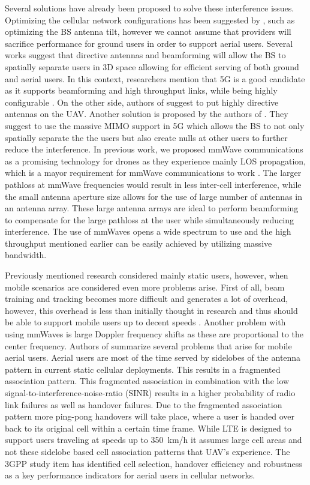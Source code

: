 \documentclass[conference,twocolumn]{IEEEtran}
\begin{document}
\par Several solutions have already been proposed to solve these interference issues. Optimizing the cellular network configurations has been suggested by \cite{Azari2019}, such as optimizing the BS antenna tilt, however we cannot assume that providers will sacrifice performance for ground users in order to support aerial users. Several works suggest that directive antennas and beamforming will allow the BS to spatially separate users in 3D space allowing for efficient serving of both ground and aerial users. In this context, researchers mention that 5G is a good candidate as it supports beamforming and high throughput links, while being highly configurable \cite{Lin2018}. On the other side, authors of \cite{Izydorczyk2020} suggest to put highly directive antennas on the UAV. Another solution is proposed by the authors of \cite{Garcia-Rodriguez2019}. They suggest to use the massive MIMO support in 5G which allows the BS to not only spatially separate the the users but also create nulls at other users to further reduce the interference. In previous work, we proposed mmWave communications as a promising technology for drones as they experience mainly LOS propagation, which is a mayor requirement for mmWave communications to work \cite{Colpaert2018}. The larger pathloss at mmWave frequencies would result in less inter-cell interference, while the small antenna aperture size allows for the use of large number of antennas in an antenna array. These large antenna arrays are ideal to perform beamforming to compensate for the large pathloss at the user while simultaneously reducing interference. The use of mmWaves opens a wide spectrum to use and the high throughput mentioned earlier can be easily achieved by utilizing massive bandwidth. 
\par Previously mentioned research considered mainly static users, however, when mobile scenarios are considered even more problems arise. First of all, beam training and tracking becomes more difficult and generates a lot of overhead, however, this overhead is less than initially thought in research and thus should be able to support mobile users up to decent speeds \cite{Huang2020}. Another problem with using mmWaves is large Doppler frequency shifts as these are proportional to the center frequency. Authors of \cite{Stanczak2018} summarize several problems that arise for mobile aerial users. Aerial users are most of the time served by sidelobes of the antenna pattern in current static cellular deployments. This results in a fragmented association pattern. This fragmented association in combination with the low signal-to-interference-noise-ratio (SINR) results in a higher probability of radio link failures as well as handover failures. Due to the fragmented association pattern more ping-pong handovers will take place, where a user is handed over back to its original cell within a certain time frame. While LTE is designed to support users traveling at speeds up to 350~km/h\cite{3gpp.36.101} it assumes large cell areas and not these sidelobe based cell association patterns that UAV's experience. The 3GPP study item has identified cell selection, handover efficiency and robustness as a key performance indicators for aerial users in cellular networks\cite{3gpp.36.777}.
\end{document}

